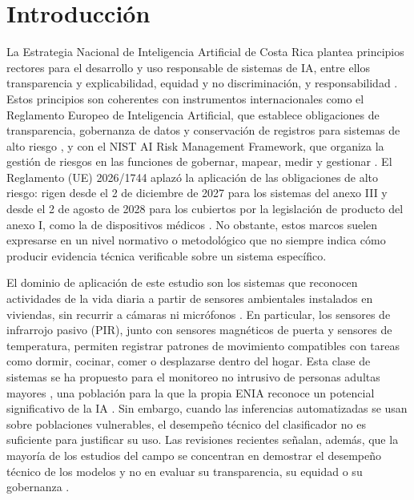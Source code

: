 
\section{Introducción}

La Estrategia Nacional de Inteligencia Artificial de Costa Rica plantea
principios rectores para el desarrollo y uso responsable de sistemas de IA,
entre ellos transparencia y explicabilidad, equidad y no discriminación, y
responsabilidad \cite{micitt2024enia}. Estos principios son coherentes con
instrumentos internacionales como el Reglamento Europeo de Inteligencia
Artificial, que establece obligaciones de transparencia, gobernanza de datos y
conservación de registros para sistemas de alto riesgo \cite{ue2024aiact}, y con
el NIST AI Risk Management Framework, que organiza la gestión de riesgos en las
funciones de gobernar, mapear, medir y gestionar \cite{nist2023airmf}. El
Reglamento (UE) 2026/1744 aplazó la aplicación de las obligaciones de alto riesgo:
rigen desde el 2 de diciembre de 2027 para los sistemas del anexo III y desde el
2 de agosto de 2028 para los cubiertos por la legislación de producto del anexo I,
como la de dispositivos médicos \cite{ue2024aiact}. No obstante, estos marcos suelen expresarse en un nivel normativo o metodológico
que no siempre indica cómo producir evidencia técnica verificable sobre un
sistema específico.

El dominio de aplicación de este estudio son los sistemas que reconocen
actividades de la vida diaria a partir de sensores ambientales instalados en
viviendas, sin recurrir a cámaras ni micrófonos
\cite{kim2022inhome,requena2024independence}. En particular, los sensores de
infrarrojo pasivo (PIR), junto con sensores magnéticos de puerta y sensores de
temperatura, permiten registrar patrones de movimiento compatibles con tareas
como dormir, cocinar, comer o desplazarse dentro del hogar. Esta clase de
sistemas se ha propuesto para el monitoreo no intrusivo de personas adultas
mayores \cite{park2025aging}, una población para la que la propia ENIA reconoce
un potencial significativo de la IA \cite[p.~27]{micitt2024enia}. Sin embargo,
cuando las inferencias automatizadas se usan sobre poblaciones vulnerables, el
desempeño técnico del clasificador no es suficiente para justificar su uso.
Las revisiones recientes señalan, además, que la mayoría de los estudios del
campo se concentran en demostrar el desempeño técnico de los modelos y no en
evaluar su transparencia, su equidad o su gobernanza
\cite{park2025aging,habibovic2025aging}.

